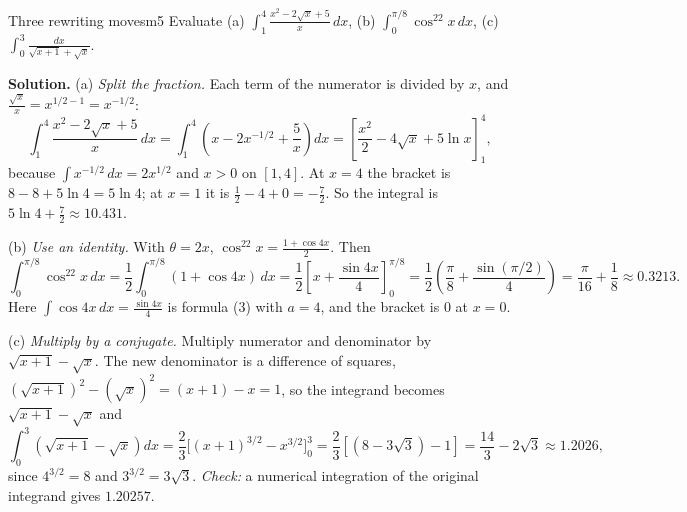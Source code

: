 \documentclass[11pt]{article}
\begin{document}
\begin{exmp}{Three rewriting moves}{m5}
Evaluate (a) $\int_1^4\frac{x^2-2\sqrt x+5}{x}\,dx$, (b) $\int_0^{\pi/8}\cos^22x\,dx$, (c) $\int_0^3\frac{dx}{\sqrt{x+1}+\sqrt x}$.

\textbf{Solution.} (a) \emph{Split the fraction.} Each term of the numerator is divided by $x$, and $\frac{\sqrt x}x=x^{1/2-1}=x^{-1/2}$:
\[\int_1^4\frac{x^2-2\sqrt x+5}{x}\,dx=\int_1^4\left(x-2x^{-1/2}+\frac5x\right)dx=\left[\frac{x^2}2-4\sqrt x+5\ln x\right]_1^4 ,\]
because $\int x^{-1/2}\,dx=2x^{1/2}$ and $x>0$ on $[1,4]$. At $x=4$ the bracket is $8-8+5\ln4=5\ln4$; at $x=1$ it is $\frac12-4+0=-\frac72$. So the integral is $5\ln4+\frac72\approx10.431$.

(b) \emph{Use an identity.} With $\theta=2x$, $\cos^22x=\frac{1+\cos4x}2$. Then
\[\int_0^{\pi/8}\cos^22x\,dx=\frac12\int_0^{\pi/8}(1+\cos4x)\,dx=\frac12\left[x+\frac{\sin4x}4\right]_0^{\pi/8}=\frac12\left(\frac\pi8+\frac{\sin(\pi/2)}4\right)=\frac\pi{16}+\frac18\approx0.3213 .\]
Here $\int\cos4x\,dx=\frac{\sin4x}4$ is formula (3) with $a=4$, and the bracket is $0$ at $x=0$.

(c) \emph{Multiply by a conjugate.} Multiply numerator and denominator by $\sqrt{x+1}-\sqrt x$. The new denominator is a difference of squares, $(\sqrt{x+1})^2-(\sqrt x)^2=(x+1)-x=1$, so the integrand becomes $\sqrt{x+1}-\sqrt x$ and
\[\int_0^3\left(\sqrt{x+1}-\sqrt x\right)dx=\frac23\Big[(x+1)^{3/2}-x^{3/2}\Big]_0^3=\frac23\left[(8-3\sqrt3)-1\right]=\frac{14}3-2\sqrt3\approx1.2026 ,\]
since $4^{3/2}=8$ and $3^{3/2}=3\sqrt3$. \emph{Check:} a numerical integration of the original integrand gives $1.20257$.
\end{exmp}
\end{document}
